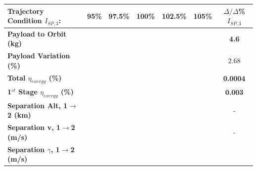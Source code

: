 \begin{table}[ht]
	\centering
	\begin{tabular}{l c c c c c c} 
		\hline \textbf{Trajectory Condition}   \qquad  $I_{SP,3}$:
		&95\%
		&97.5\%
		&100\%
		&102.5\%
		&105\%
		& $\Delta/\Delta$\%$I_{SP,3}$
		\\
		\hline \textbf{Payload to Orbit (kg)}
		& \textbf{\PayloadToOrbitISPThreeNinety}
		& \textbf{\PayloadToOrbitISPThreeNinetyFive}
		& \textbf{\PayloadToOrbitISPThreeStandard}
		& \textbf{\PayloadToOrbitISPThreeOneHundredFive}
		& \textbf{\PayloadToOrbitISPThreeOneHundredTen}
		&\textbf{4.6}
		\\
		\textbf{Payload Variation (\%)}
		& \PayloadVarISPThreeNinety
		& \PayloadVarISPThreeNinetyFive
		& \PayloadVarISPThreeStandard
		& \PayloadVarISPThreeOneHundredFive
		& \PayloadVarISPThreeOneHundredTen
		&2.68
		\\
		\textbf{Total $\eta_{exergy}$ (\%)}
		& \textbf{\totalExergyEffISPThreeNinety}
		& \textbf{\totalExergyEffISPThreeNinetyFive}
		& \textbf{\totalExergyEffISPThreeStandard}
		& \textbf{\totalExergyEffISPThreeOneHundredFive}
		& \textbf{\totalExergyEffISPThreeOneHundredTen}
		& \textbf{0.0004}
		\\
		\hline 
		\textbf{1$^{st}$ Stage $\eta_{exergy}$ (\%)}
		& \textbf{\firstExergyEffISPThreeNinety}
		& \textbf{\firstExergyEffISPThreeNinetyFive}
		& \textbf{\firstExergyEffISPThreeStandard}
		& \textbf{\firstExergyEffISPThreeOneHundredFive}
		& \textbf{\firstExergyEffISPThreeOneHundredTen}
		& \textbf{0.003}
		\\
		\textbf{Separation Alt, 1$\rightarrow$2 (km)}
		& \firstsecondSeparationAltISPThreeNinety
		& \firstsecondSeparationAltISPThreeNinetyFive
		& \firstsecondSeparationAltISPThreeStandard
		& \firstsecondSeparationAltISPThreeOneHundredFive
		& \firstsecondSeparationAltISPThreeOneHundredTen
		& -
		\\
		\textbf{Separation v, 1$\rightarrow$2 (m/s)}
		& \firstsecondSeparationvISPThreeNinety
		& \firstsecondSeparationvISPThreeNinetyFive
		& \firstsecondSeparationvISPThreeStandard
		& \firstsecondSeparationvISPThreeOneHundredFive
		& \firstsecondSeparationvISPThreeOneHundredTen
		& -
		\\
		\textbf{Separation $\gamma$, 1$\rightarrow$2 (m/s)}
		& \firstsecondSeparationgammaISPThreeNinety
		& \firstsecondSeparationgammaISPThreeNinetyFive
		& \firstsecondSeparationgammaISPThreeStandard
		& \firstsecondSeparationgammaISPThreeOneHundredFive

\end{tabular}
\end{table}
